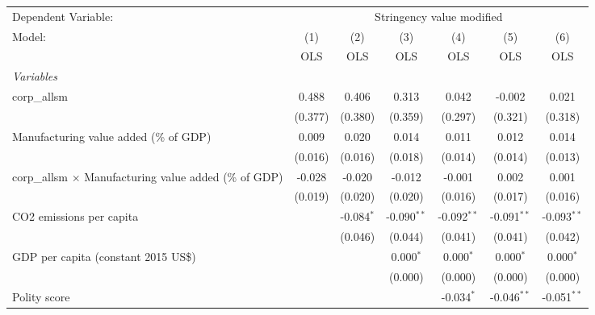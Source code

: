 
\begingroup
\centering
\begin{tabular}{lcccccc}
   \toprule
   Dependent Variable: & \multicolumn{6}{c}{Stringency value modified}\\
   Model:                                                        & (1)     & (2)          & (3)           & (4)           & (5)           & (6)\\  
                                                                 &  OLS    & OLS          & OLS           & OLS           & OLS           & OLS\\  
   \midrule
   \emph{Variables}\\
   corp\_allsm                                                   & 0.488   & 0.406        & 0.313         & 0.042         & -0.002        & 0.021\\   
                                                                 & (0.377) & (0.380)      & (0.359)       & (0.297)       & (0.321)       & (0.318)\\   
   Manufacturing value added (\% of GDP)                         & 0.009   & 0.020        & 0.014         & 0.011         & 0.012         & 0.014\\   
                                                                 & (0.016) & (0.016)      & (0.018)       & (0.014)       & (0.014)       & (0.013)\\   
   corp\_allsm $\times$ Manufacturing value added (\% of GDP)    & -0.028  & -0.020       & -0.012        & -0.001        & 0.002         & 0.001\\   
                                                                 & (0.019) & (0.020)      & (0.020)       & (0.016)       & (0.017)       & (0.016)\\   
   CO2 emissions per capita                                      &         & -0.084$^{*}$ & -0.090$^{**}$ & -0.092$^{**}$ & -0.091$^{**}$ & -0.093$^{**}$\\   
                                                                 &         & (0.046)      & (0.044)       & (0.041)       & (0.041)       & (0.042)\\   
   GDP per capita (constant 2015 US\$)                           &         &              & 0.000$^{*}$   & 0.000$^{*}$   & 0.000$^{*}$   & 0.000$^{*}$\\   
                                                                 &         &              & (0.000)       & (0.000)       & (0.000)       & (0.000)\\   
   Polity score                                                  &         &              &               & -0.034$^{*}$  & -0.046$^{**}$ & -0.051$^{**}$\\   

\end{tabular}
